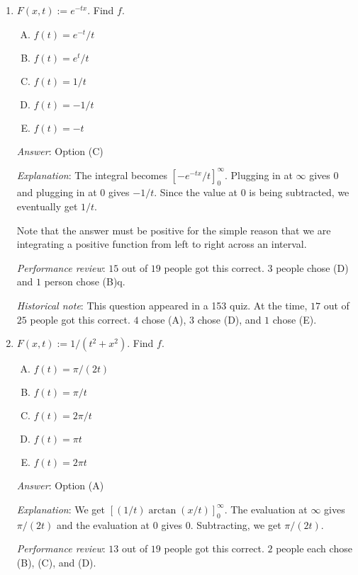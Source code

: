 \documentclass[10pt]{amsart}
\begin{document}
\begin{enumerate}

\item $F(x,t) := e^{-tx}$. Find $f$.

  \begin{enumerate}[(A)]
  \item $f(t) = e^{-t}/t$
  \item $f(t) = e^t/t$
  \item $f(t) = 1/t$
  \item $f(t) = -1/t$
  \item $f(t) = -t$
  \end{enumerate}

  {\em Answer}: Option (C)

  {\em Explanation}: The integral becomes
  $[-e^{-tx}/t]_0^\infty$. Plugging in at $\infty$ gives $0$ and
  plugging in at $0$ gives $-1/t$. Since the value at $0$ is being
  subtracted, we eventually get $1/t$.

  Note that the answer must be positive for the simple reason that we
  are integrating a positive function from left to right across an
  interval.

  {\em Performance review}: $15$ out of $19$ people got this
  correct. $3$ people chose (D) and $1$ person chose (B)q.

  {\em Historical note}: This question appeared in a 153 quiz. At the
  time, $17$ out of $25$ people got this correct. $4$ chose (A), $3$
  chose (D), and $1$ chose (E).

\item $F(x,t) := 1/(t^2 + x^2)$. Find $f$.

  \begin{enumerate}[(A)]
  \item $f(t) = \pi/(2t)$
  \item $f(t) = \pi/t$
  \item $f(t) = 2\pi/t$
  \item $f(t) = \pi t$
  \item $f(t) = 2\pi t$
  \end{enumerate}

  {\em Answer}: Option (A)

  {\em Explanation}: We get $[(1/t)\arctan(x/t)]_0^\infty$. The
  evaluation at $\infty$ gives $\pi/(2t)$ and the evaluation at $0$
  gives $0$. Subtracting, we get $\pi/(2t)$.

  {\em Performance review}: $13$ out of $19$ people got this
  correct. $2$ people each chose (B), (C), and (D).


\end{enumerate}
\end{document}
